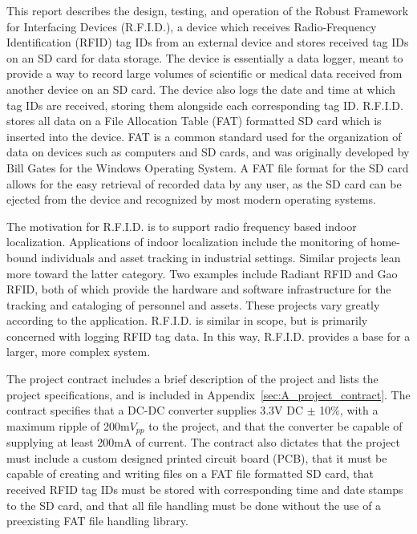 This report describes the design, testing, and operation of the Robust Framework for Interfacing Devices (R.F.I.D.), a device which receives Radio-Frequency Identification (RFID) tag IDs from an external device and stores received tag IDs on an SD card for data storage. The device is essentially a data logger, meant to provide a way to record large volumes of scientific or medical data received from another device on an SD card. The device also logs the date and time at which tag IDs are received, storing them alongside each corresponding tag ID. R.F.I.D. stores all data on a File Allocation Table (FAT) formatted SD card which is inserted into the device. FAT is a common standard used for the organization of data on devices such as computers and SD cards, and was originally developed by Bill Gates for the Windows Operating System. A FAT file format for the SD card allows for the easy retrieval of recorded data by any user, as the SD card can be ejected from the device and recognized by most modern operating systems.



The motivation for R.F.I.D. is to support radio frequency based indoor localization. Applications of indoor localization include the monitoring of home-bound individuals and asset tracking in industrial settings. Similar projects lean more toward the latter category. Two examples include Radiant RFID and Gao RFID, both of which provide the hardware and software infrastructure for the tracking and cataloging of personnel and assets. These projects vary greatly according to the application. R.F.I.D. is similar in scope, but is primarily concerned with logging RFID tag data. In this way, R.F.I.D. provides a base for a larger, more complex system.

The project contract includes a brief description of the project and lists the project specifications, and is included in Appendix~\ref{sec:A_project_contract}. The contract specifies that a DC-DC converter supplies 3.3V DC $\pm$ 10$\%$, with a maximum ripple of 200m$V_{pp}$ to the project, and that the converter be capable of supplying at least 200mA of current. The contract also dictates that the project must include a custom designed printed circuit board (PCB), that it must be capable of creating and writing files on a FAT file formatted SD card, that received RFID tag IDs must be stored with corresponding time and date stamps to the SD card, and that all file handling must be done without the use of a preexisting FAT file handling library.

